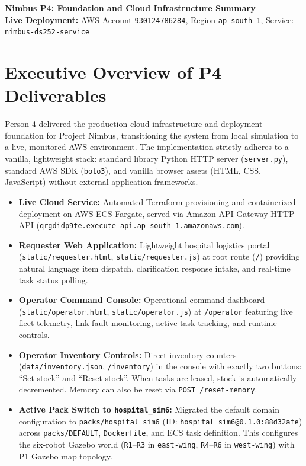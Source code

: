\documentclass[10pt,letterpaper]{article}
\begin{document}
\pagestyle{empty}

\begin{center}
{\Large\textbf{Nimbus P4: Foundation and Cloud Infrastructure Summary}}\\[2pt]
{\small\textbf{Live Deployment:} AWS Account \texttt{930124786284}, Region \texttt{ap-south-1}, Service: \texttt{nimbus-ds252-service}}
\end{center}
\vspace{-6pt}

\section{Executive Overview of P4 Deliverables}
Person 4 delivered the production cloud infrastructure and deployment foundation for Project Nimbus, transitioning the system from local simulation to a live, monitored AWS environment. The implementation strictly adheres to a vanilla, lightweight stack: standard library Python HTTP server (\texttt{server.py}), standard AWS SDK (\texttt{boto3}), and vanilla browser assets (HTML, CSS, JavaScript) without external application frameworks.

\begin{itemize}
  \item \textbf{Live Cloud Service:} Automated Terraform provisioning and containerized deployment on AWS ECS Fargate, served via Amazon API Gateway HTTP API (\texttt{qrgdidp9te.execute-api.ap-south-1.amazonaws.com}).
  \item \textbf{Requester Web Application:} Lightweight hospital logistics portal (\texttt{static/requester.html}, \texttt{static/requester.js}) at root route (\texttt{/}) providing natural language item dispatch, clarification response intake, and real-time task status polling.
  \item \textbf{Operator Command Console:} Operational command dashboard (\texttt{static/operator.html}, \texttt{static/operator.js}) at \texttt{/operator} featuring live fleet telemetry, link fault monitoring, active task tracking, and runtime controls.
  \item \textbf{Operator Inventory Controls:} Direct inventory counters (\texttt{data/inventory.json}, \texttt{/inventory}) in the console with exactly two buttons: ``Set stock'' and ``Reset stock''. When tasks are leased, stock is automatically decremented. Memory can also be reset via \texttt{POST /reset-memory}.
  \item \textbf{Active Pack Switch to \texttt{hospital\_sim6}:} Migrated the default domain configuration to \texttt{packs/hospital\_sim6} (ID: \texttt{hospital\_sim6@0.1.0:88d32afe}) across \texttt{packs/DEFAULT}, \texttt{Dockerfile}, and ECS task definition. This configures the six-robot Gazebo world (\texttt{R1}--\texttt{R3} in \texttt{east-wing}, \texttt{R4}--\texttt{R6} in \texttt{west-wing}) with P1 Gazebo map topology.
\end{itemize}
\end{document}

